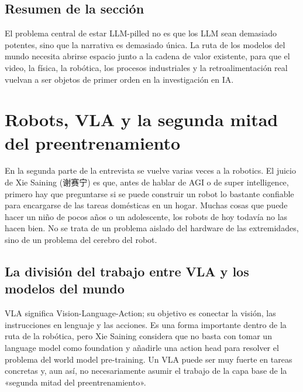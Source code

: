 \documentclass[a4paper]{article}
\begin{document}
\subsection{Resumen de la sección}

El problema central de estar LLM-pilled no es que los LLM sean demasiado potentes, sino que la narrativa es demasiado única. La ruta de los modelos del mundo necesita abrirse espacio junto a la cadena de valor existente, para que el video, la física, la robótica, los procesos industriales y la retroalimentación real vuelvan a ser objetos de primer orden en la investigación en IA.
\section{Robots, VLA y la segunda mitad del preentrenamiento}

En la segunda parte de la entrevista se vuelve varias veces a la robotics. El juicio de Xie Saining (谢赛宁) es que, antes de hablar de AGI o de super intelligence, primero hay que preguntarse si se puede construir un robot lo bastante confiable para encargarse de las tareas domésticas en un hogar. Muchas cosas que puede hacer un niño de pocos años o un adolescente, los robots de hoy todavía no las hacen bien. No se trata de un problema aislado del hardware de las extremidades, sino de un problema del cerebro del robot.

\subsection{La división del trabajo entre VLA y los modelos del mundo}

VLA significa Vision-Language-Action; su objetivo es conectar la visión, las instrucciones en lenguaje y las acciones. Es una forma importante dentro de la ruta de la robótica, pero Xie Saining considera que no basta con tomar un language model como foundation y añadirle una action head para resolver el problema del world model pre-training. Un VLA puede ser muy fuerte en tareas concretas y, aun así, no necesariamente asumir el trabajo de la capa base de la «segunda mitad del preentrenamiento».
\end{document}
